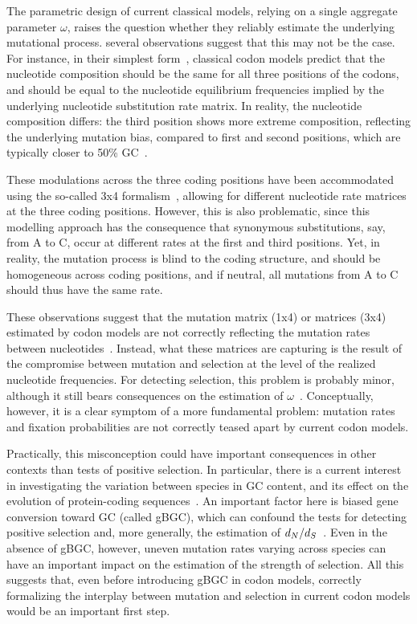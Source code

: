 The parametric design of current classical models, relying on a single aggregate parameter $\omega$, raises the question whether they reliably estimate the underlying mutational process.
several observations suggest that this may not be the case.
For instance, in their simplest form~\citep{Muse1994, Goldman1994}, classical codon models predict that the nucleotide composition should be the same for all three positions of the codons, and should be equal to the nucleotide equilibrium frequencies implied by the underlying nucleotide substitution rate matrix.
In reality, the nucleotide composition differs: the third position shows more extreme composition, reflecting the underlying mutation bias, compared to first and second positions, which are typically closer to 50\% GC~\citep{Singer2000}.

These modulations across the three coding positions have been accommodated using the so-called 3x4 formalism~\citep{Goldman1994, Pond2005a}, allowing for different nucleotide rate matrices at the three coding positions.
However, this is also problematic, since this modelling approach has the consequence that synonymous substitutions, say, from A to C, occur at different rates at the first and third positions.
Yet, in reality, the mutation process is blind to the coding structure, and should be homogeneous across coding positions, and if neutral, all mutations from A to C should thus have the same rate.

These observations suggest that the mutation matrix (1x4) or matrices (3x4) estimated by codon models are not correctly reflecting the mutation rates between nucleotides~\citep{Rodrigue2008a}.
Instead, what these matrices are capturing is the result of the compromise between mutation and selection at the level of the realized nucleotide frequencies.
For detecting selection, this problem is probably minor, although it still bears consequences on the estimation of $\omega$~\citep{Spielman2015}.
Conceptually, however, it is a clear symptom of a more fundamental problem: mutation rates and fixation probabilities are not correctly teased apart by current codon models.

Practically, this misconception could have important consequences in other contexts than tests of positive selection.
In particular, there is a current interest in investigating the variation between species in GC content, and its effect on the evolution of protein-coding sequences~\citep{Bolivar2019}.
An important factor here is biased gene conversion toward GC (called gBGC), which can confound the tests for detecting positive selection and, more generally, the estimation of $d_N / d_S$~\citep{Galtier2009,Ratnakumar2010, Figuet2014}.
Even in the absence of \acrshort{gBGC}, however, uneven mutation rates varying across species can have an important impact on the estimation of the strength of selection.
All this suggests that, even before introducing \acrshort{gBGC} in codon models, correctly formalizing the interplay between mutation and selection in current codon models would be an important first step.

